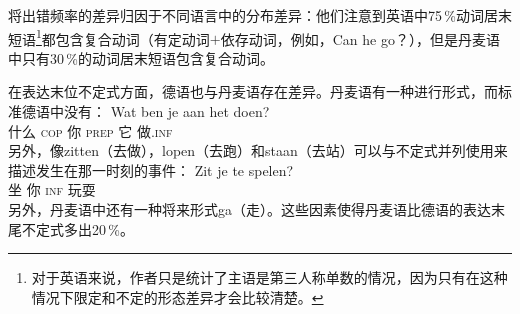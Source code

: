  \citet*{FPAG2007a}将出错频率的差异归因于不同语言中的分布差异：他们注意到英语中75\,\%动词居末短语\footnote{%
对于英语来说，作者只是统计了主语是第三人称单数的情况，因为只有在这种情况下限定和不定的形态差异才会比较清楚。%
}都包含复合动词（有定动词$+$依存动词，例如，Can he go？），但是丹麦语中只有30\,\%的动词居末短语包含复合动词。

在表达末位不定式方面，德语也与丹麦语存在差异。丹麦语有一种进行形式，而标准德语中没有：
\ea
\gll Wat ben je aan het doen?\\
     什么 \textsc{cop} 你 \textsc{prep} 它 做.\textsc{inf}\\
\z
另外，像zitten（去做），lopen（去跑）和staan（去站）可以与不定式并列使用来描述发生在那一时刻的事件：
\ea
\gll Zit je te spelen?\\
     坐 你 \textsc{inf} 玩耍\\
\z
另外，丹麦语中还有一种将来形式ga（走）。这些因素使得丹麦语比德语的表达末尾不定式多出20\,\%。


